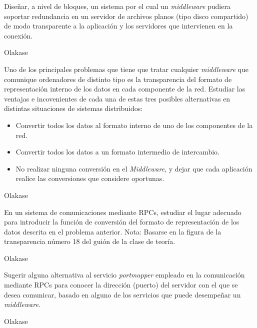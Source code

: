 
  \begin{problem}[1]
  Diseñar, a nivel de bloques, un sistema por el cual un \textit{middleware} pudiera soportar redundancia en un servidor de archivos planos (tipo disco
  compartido) de modo transparente a la aplicación y los servidores
  que intervienen en la conexión.
  

  \solution

  Olakase

  \end{problem}

  \begin{problem}[2]
  Uno de los principales problemas que tiene que tratar cualquier
\textit{middleware} que comunique ordenadores de distinto tipo es la transparencia del formato
  de representación interno de los datos en cada componente de la
  red. Estudiar las ventajas e incovenientes de cada una de estas tres posibles
  alternativas en distintas situaciones de sistemas distribuidos:
    \begin{itemize}
    \item Convertir todos los datos al formato interno de uno de los componentes
    de la red.
    \item Convertir todos los datos a un formato intermedio de intercambio.
    \item No realizar ninguna conversión en el \textit{Middleware}, y dejar que cada
aplicación realice las conversiones que considere oportunas.
\end{itemize}
    \solution

    Olakase

    \end{problem}

  \begin{problem}
  En un sistema de comunicaciones mediante RPCs, estudiar el lugar adecuado
para introducir la función de conversión del formato de representación de los
datos descrita en el problema anterior. Nota: Basarse en la figura de la
transparencia número 18 del guión de la clase de teoría.
  \solution

  Olakase

  \end{problem}

  \begin{problem}
  Sugerir alguna alternativa al servicio \textit{portmapper} empleado en la
comunicación mediante RPCs para conocer la dirección (puerto) del servidor
con el que se desea comunicar, basado en alguno de los servicios que puede
desempeñar un \textit{middleware}.
  \solution

  Olakase

  \end{problem}

